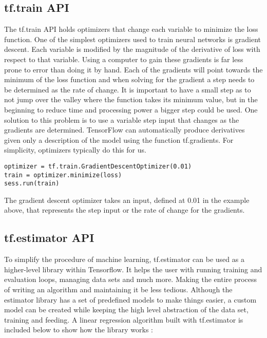 \subsection{tf.train API}
The tf.train API holds optimizers that change each variable to minimize the loss function.
One of the simplest optimizers used to train neural networks is gradient descent.
Each variable is modified by the magnitude of the derivative of loss with respect to that variable.
Using a computer to gain these gradients is far less prone to error than doing it by hand.
Each of the gradients will point towards the minimum of the loss function and when solving for the gradient a step needs to be determined as the rate of change.
It is important to  have a small step as to not jump over the valley where the function takes its minimum value,
but in the beginning to reduce time and processing power a bigger step could be used.
One solution to this problem is to use a variable step input that changes as the gradients are determined.
TensorFlow can automatically produce derivatives given only a description of the model using the function tf.gradients.
For simplicity, optimizers typically do this for us.
\begin{lstlisting}
optimizer = tf.train.GradientDescentOptimizer(0.01)
train = optimizer.minimize(loss)
sess.run(train)
\end{lstlisting}
The gradient descent optimizer takes an input, defined at 0.01 in the example above,
that represents the step input or the rate of change for the gradients.

\subsection{tf.estimator API}
To simplify the procedure of machine learning,
tf.estimator can be used as a higher-level library within Tensorflow.
It helps the user with running training and evaluation loops, managing data sets and much more. 
Making the entire process of writing an algorithm and maintaining it be less tedious.
Although the estimator library has a set of predefined models to make things easier, a custom model can be created while keeping the high
level abstraction of the data set, training and feeding.
A linear regression algorithm built with tf.estimator is included below
to show how the library works \cite{Estimator}:


